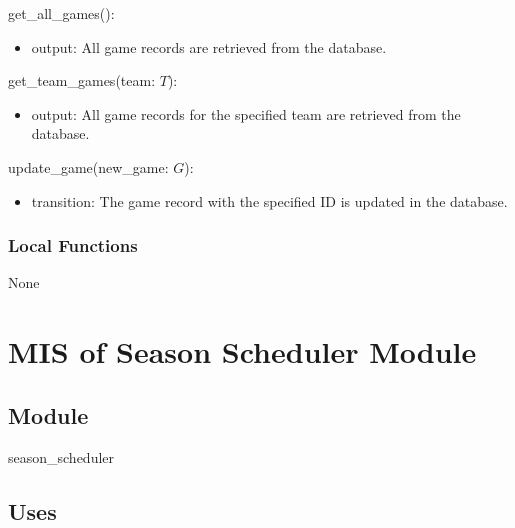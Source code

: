 \documentclass[12pt, titlepage]{article}
\begin{document}
\noindent get\_all\_games():
\begin{itemize}
\item output: All game records are retrieved from the database.
\end{itemize}

\noindent get\_team\_games(team: $T$):
\begin{itemize}
\item output: All game records for the specified team are retrieved from the database.
\end{itemize}

\noindent update\_game(new\_game: $G$):
\begin{itemize}
\item transition: The game record with the specified ID is updated in the database.
\end{itemize}


\subsubsection{Local Functions}


None

\newpage

\section{MIS of Season Scheduler Module} \label{mS}



\subsection{Module}

season\_scheduler

\subsection{Uses}
\end{document}
